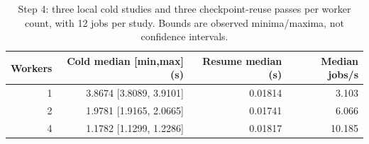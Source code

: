 \begin{table}[htbp]\centering\small\begin{tabular}{r r r r}\toprule Workers & Cold median [min,max] (s) & Resume median (s) & Median jobs/s\\\midrule
1 & 3.8674 [3.8089, 3.9101] & 0.01814 & 3.103\\
2 & 1.9781 [1.9165, 2.0665] & 0.01741 & 6.066\\
4 & 1.1782 [1.1299, 1.2286] & 0.01817 & 10.185\\\bottomrule\end{tabular}\caption{Step 4: three local cold studies and three checkpoint-reuse passes per worker count, with 12 jobs per study. Bounds are observed minima/maxima, not confidence intervals.}\label{tab:systemperformance}\end{table}
